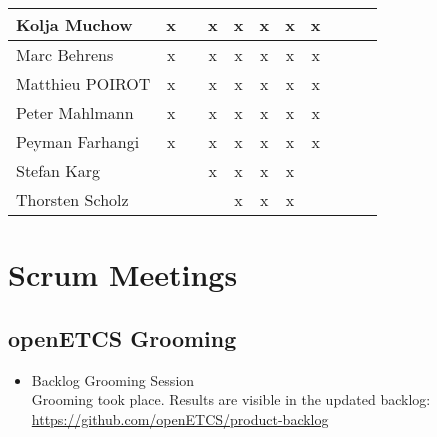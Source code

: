 \documentclass[a4paper, 11pt]{article}
\begin{document}
\begin{tabular}{|l|c|c|c|c||c|c|c||c|c|c|}
Kolja Muchow  & x &   & x & x & x & x & x \\\hline
Marc Behrens         & x &   & x & x & x & x & x  \\\hline
Matthieu POIROT       & x  &   & x  & x & x & x & x  \\\hline
Peter Mahlmann       & x &   & x & x & x & x & x \\\hline
Peyman Farhangi      & x  &   & x & x & x & x & x  \\\hline
Stefan Karg          &   &   & x  & x & x & x &  \\\hline
Thorsten Scholz      &   &   &  & x & x & x &  \\\hline
\end{tabular}


\section{Scrum Meetings}

\subsection{openETCS Grooming}
\begin{itemize}
\item Backlog Grooming Session\\
Grooming took place. Results are visible in the updated backlog:\\
\url{https://github.com/openETCS/product-backlog}

\end{itemize}
\end{document}

